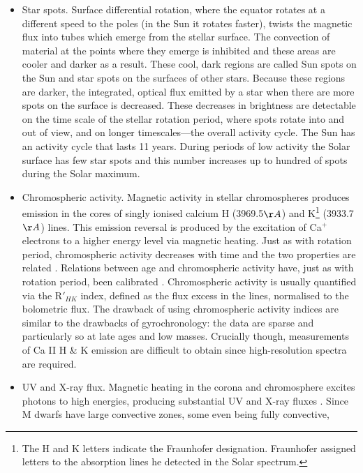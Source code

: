 \begin{itemize}
\item{Star spots.
Surface differential rotation, where the equator rotates at a different speed
to the poles (in the Sun it rotates faster), twists the magnetic flux into
tubes which emerge from the stellar surface.
The convection of material at the points where they emerge is inhibited and
these areas are cooler and darker as a result.
These cool, dark regions are called Sun spots on the Sun and star spots on the
surfaces of other stars.
Because these regions are darker, the integrated, optical flux emitted by a
star when there are more spots on the surface is decreased.
These decreases in brightness are detectable on the time scale of the stellar
rotation period, where spots rotate into and out of view, and on longer
timescales---the overall activity cycle.
The Sun has an activity cycle that lasts 11 years.
During periods of low activity the Solar surface has few star spots and this
number increases up to hundred of spots during the Solar maximum.}
\item{Chromospheric activity.
Magnetic activity in stellar chromospheres produces emission in the cores of
singly ionised calcium H (3969.5$\AA$) and K\footnote{The H and K letters
indicate the Fraunhofer designation.
Fraunhofer assigned letters to the absorption lines he detected in the Solar
spectrum.} (3933.7$\AA$) lines.
This emission reversal is produced by the excitation of Ca$^+$ electrons to a
higher energy level via magnetic heating.
Just as with rotation period, chromospheric activity decreases with time and
the two properties are related \citep[\eg][]{Kraft1967, Noyes1984b}.
Relations between age and chromospheric activity have, just as with rotation
period, been calibrated \citep[\eg][]{Soderblom1991, Donahue1993,
Lachaume1999, Mamajek2008}.
Chromospheric activity is usually quantified via the R$\prime_{HK}$ index,
defined as the flux excess in the lines, normalised to the bolometric flux.
The drawback of using chromospheric activity indices are similar to the
drawbacks of gyrochronology: the data are sparse and particularly so at late
ages and low masses.
Crucially though, measurements of Ca II H \& K emission are difficult to
obtain since high-resolution spectra are required.
}
\item{UV and X-ray flux.}
Magnetic heating in the corona and chromosphere excites photons to high
energies, producing substantial UV and X-ray fluxes
\citep[\eg][]{Pallavicini1981}.
Since M dwarfs have large convective zones, some even being fully convective,

\end{itemize}
